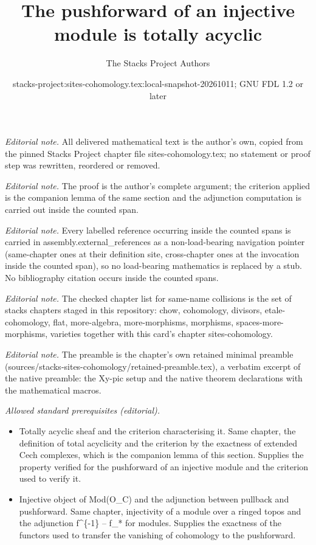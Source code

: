 \documentclass[10pt,a4paper]{amsart}
\title{The pushforward of an injective module is totally acyclic}
\author{The Stacks Project Authors}
\date{stacks-project:sites-cohomology.tex:local-snapshot-20261011; GNU FDL 1.2 or later}
\theoremstyle{plain}
\theoremstyle{definition}
\theoremstyle{remark}
\numberwithin{equation}{subsection}
\begin{document}
\maketitle
\noindent\textit{Editorial note.} All delivered mathematical text is the author's own, copied from the pinned Stacks Project chapter file sites-cohomology.tex; no statement or proof step was rewritten, reordered or removed.\par\medskip
\noindent\textit{Editorial note.} The proof is the author's complete argument; the criterion applied is the companion lemma of the same section and the adjunction computation is carried out inside the counted span.\par\medskip
\noindent\textit{Editorial note.} Every labelled reference occurring inside the counted spans is carried in assembly.external\_references as a non-load-bearing navigation pointer (same-chapter ones at their definition site, cross-chapter ones at the invocation inside the counted span), so no load-bearing mathematics is replaced by a stub. No bibliography citation occurs inside the counted spans.\par\medskip
\noindent\textit{Editorial note.} The checked chapter list for same-name collisions is the set of stacks chapters staged in this repository: chow, cohomology, divisors, etale-cohomology, flat, more-algebra, more-morphisms, morphisms, spaces-more-morphisms, varieties together with this card's chapter sites-cohomology.\par\medskip
\noindent\textit{Editorial note.} The preamble is the chapter's own retained minimal preamble (sources/stacks-sites-cohomology/retained-preamble.tex), a verbatim excerpt of the native preamble: the Xy-pic setup and the native theorem declarations with the mathematical macros.\par\medskip
\noindent\textit{Allowed standard prerequisites (editorial).}\begin{itemize}
\item Totally acyclic sheaf and the criterion characterising it. Same chapter, the definition of total acyclicity and the criterion by the exactness of extended Cech complexes, which is the companion lemma of this section. Supplies the property verified for the pushforward of an injective module and the criterion used to verify it.
\item Injective object of Mod(O\_C) and the adjunction between pullback and pushforward. Same chapter, injectivity of a module over a ringed topos and the adjunction f\textasciicircum{}\{-1\} -- f\_* for modules. Supplies the exactness of the functors used to transfer the vanishing of cohomology to the pushforward.
\end{itemize}\medskip
\end{document}
